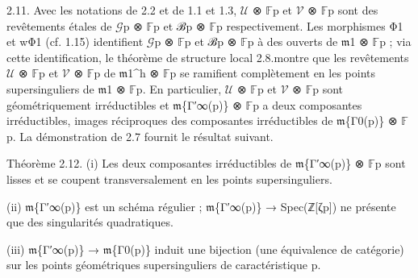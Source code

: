 \documentclass[11pt,a4paper]{article}
\begin{document}
2.11. Avec les notations de 2.2 et de 1.1 et 1.3, \ensuremath{\mathcal{U}} ⊗ \ensuremath{\mathbb{F}}\textunderscore{}p et \ensuremath{\mathcal{V}} ⊗ \ensuremath{\mathbb{F}}\textunderscore{}p sont des revêtements étales de \ensuremath{\mathcal{G}}\textunderscore{}p ⊗ \ensuremath{\mathbb{F}}\textunderscore{}p et ℬ\textunderscore{}p ⊗ \ensuremath{\mathbb{F}}\textunderscore{}p respectivement. Les morphismes Φ\textunderscore{}1 et wΦ\textunderscore{}1 (cf. 1.15) identifient \ensuremath{\mathcal{G}}\textunderscore{}p ⊗ \ensuremath{\mathbb{F}}\textunderscore{}p et ℬ\textunderscore{}p ⊗ \ensuremath{\mathbb{F}}\textunderscore{}p à des ouverts de \ensuremath{\mathfrak{m}}\textunderscore{}1 ⊗ \ensuremath{\mathbb{F}}\textunderscore{}p ; via cette identification, le théorème de structure local 2.8.montre que les revêtements \ensuremath{\mathcal{U}} ⊗ \ensuremath{\mathbb{F}}\textunderscore{}p et \ensuremath{\mathcal{V}} ⊗ \ensuremath{\mathbb{F}}\textunderscore{}p de \ensuremath{\mathfrak{m}}\textunderscore{}1\textasciicircum{}h ⊗ \ensuremath{\mathbb{F}}\textunderscore{}p se ramifient complètement en les points supersinguliers de \ensuremath{\mathfrak{m}}\textunderscore{}1 ⊗ \ensuremath{\mathbb{F}}\textunderscore{}p. En particulier, \ensuremath{\mathcal{U}} ⊗ \ensuremath{\mathbb{F}}\textunderscore{}p et \ensuremath{\mathcal{V}} ⊗ \ensuremath{\mathbb{F}}\textunderscore{}p sont géométriquement irréductibles et \ensuremath{\mathfrak{m}}\textunderscore{}\{Γ′\textunderscore{}∞(p)\} ⊗ \ensuremath{\mathbb{F}}\textunderscore{}p a deux composantes irréductibles, images réciproques des composantes irréductibles de \ensuremath{\mathfrak{m}}\textunderscore{}\{Γ\textunderscore{}0(p)\} ⊗ \ensuremath{\mathbb{F}}\textunderscore{}p. La démonstration de 2.7 fournit le résultat suivant.

Théorème 2.12. (i) Les deux composantes irréductibles de \ensuremath{\mathfrak{m}}\textunderscore{}\{Γ′\textunderscore{}∞(p)\} ⊗ \ensuremath{\mathbb{F}}\textunderscore{}p sont lisses et se coupent transversalement en les points supersinguliers.

(ii) \ensuremath{\mathfrak{m}}\textunderscore{}\{Γ′\textunderscore{}∞(p)\} est un schéma régulier ; \ensuremath{\mathfrak{m}}\textunderscore{}\{Γ′\textunderscore{}∞(p)\} → Spec(ℤ[ζ\textunderscore{}p]) ne présente que des singularités quadratiques.

(iii) \ensuremath{\mathfrak{m}}\textunderscore{}\{Γ′\textunderscore{}∞(p)\} → \ensuremath{\mathfrak{m}}\textunderscore{}\{Γ\textunderscore{}0(p)\} induit une bijection (une équivalence de catégorie) sur les points géométriques supersinguliers de caractéristique p.
\end{document}
